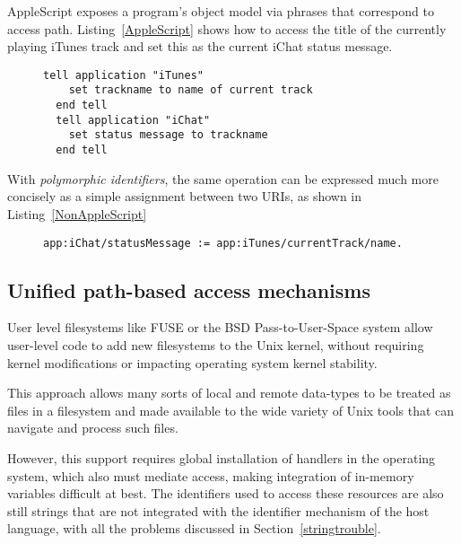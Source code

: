 \documentclass[preprint,authoryear]{acm_proc_article-sp}
\begin{document}
AppleScript\cite{applescript-hopl3} exposes a program's object model via
phrases that correspond to access path.  Listing~\ref{AppleScript} shows 
how to access the title of the currently playing iTunes track and set this
as the current iChat status message.

\begin{figure}[htbp]
\begin{lstlisting}[style=L,label= AppleScript,caption=Using AppleScript to set chat status from track name.]
  tell application "iTunes"
    set trackname to name of current track
  end tell
  tell application "iChat"
    set status message to trackname
  end tell
\end{lstlisting}
\end{figure}

With \emph{polymorphic identifiers}, the same operation can be expressed
much more concisely as a simple assignment between two URIs,
as shown in Listing~\ref{NonAppleScript}


\begin{figure}[htbp]
\begin{lstlisting}[style=L,label=NonAppleScript,caption=Access to applications via \emph{polymorphic identifiers}.]
  app:iChat/statusMessage := app:iTunes/currentTrack/name.
\end{lstlisting}
\end{figure}


\subsection{Unified path-based access mechanisms}


User level filesystems like FUSE\cite{fuse} or the BSD Pass-to-User-Space\cite{puffs} 
system allow
user-level code to add new filesystems to the Unix kernel, without requiring
kernel modifications or impacting operating system kernel stability.

This approach allows many sorts of local and remote data-types to be 
treated as files in a filesystem and made available to the wide variety
of Unix tools that can navigate and process such files.  

However, this support requires global installation of handlers in the operating
system, which also must mediate access, making integration of in-memory 
variables difficult at best.  The identifiers used to access these resources
are also still strings that are not integrated with the identifier mechanism of
the host language, with all the problems discussed in Section~\ref{stringtrouble}.
\end{document}
